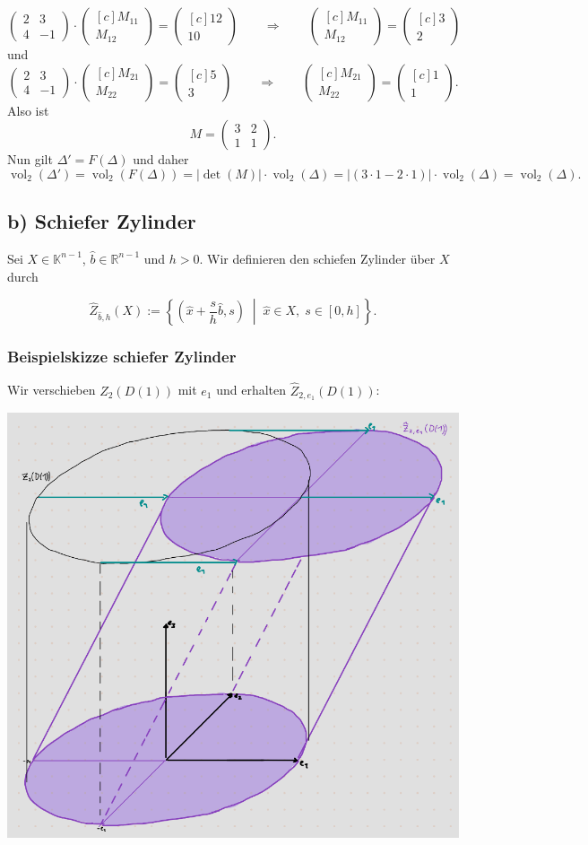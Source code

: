 \documentclass{article}
\newcommand{\imp}{\mathbb{\Rightarrow}}
\DeclareMathOperator{\vol}{vol}
\newcommand{\vect}[1]{\begin{pmatrix*}[c] #1 \end{pmatrix*}}
\newcommand{\legs}[2]{\left(\begin{array}{#1}#2\end{array}\right)}
\begin{document}
\[
\legs{cc}{2 & 3 \\ 4 & -1} \cdot \vect{M_{11} \\ M_{12}}= \vect{12 \\ 10}
\qquad\imp\qquad
\vect{M_{11} \\ M_{12}} = \vect{3 \\ 2}
\]
und
\[
\legs{cc}{2 & 3 \\ 4 & -1} \cdot \vect{M_{21} \\ M_{22}}= \vect{5 \\ 3}
\qquad\imp\qquad
\vect{M_{21} \\ M_{22}} = \vect{1 \\ 1}.
\]
Also ist 
\[
M = \legs{cc}{3 & 2 \\ 1 & 1}.
\]
Nun gilt $\Delta' = F(\Delta)$ und daher
\[
\vol_2(\Delta') = \vol_2(F(\Delta)) = |\det(M)| \cdot \vol_2(\Delta)
= |(3 \cdot 1 - 2 \cdot 1)| \cdot \vol_2(\Delta) = \vol_2(\Delta).
\]




\newpage
\subsection*{b) Schiefer Zylinder}

Sei \( X \in \mathbb{K}^{n-1} \), \( \hat{b} \in \mathbb{R}^{n-1} \) und \( h > 0 \). Wir definieren den schiefen Zylinder über \( X \) durch

\[
\hat{Z}_{\hat{b},h}(X) := \left\{ 
\left( \hat{x} + \frac{s}{h} \hat{b}, s \right) \; \middle| \; \hat{x} \in X, \; s \in [0, h] 
\right\}.
\]

\subsubsection*{Beispielskizze schiefer Zylinder}
Wir verschieben $Z_2(D(1))$ mit $e_1$ und erhalten $\hat{Z}_{2,e_1}(D(1))$:
\begin{center}
  \includegraphics[width=1\textwidth]{skizze.png}
\end{center}
\end{document}
